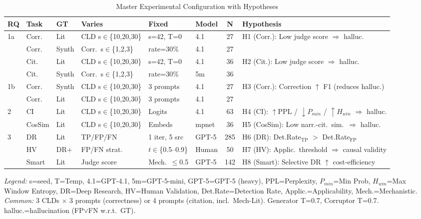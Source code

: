 \begin{table}[H]
\centering
\caption{Master Experimental Configuration with Hypotheses}
\label{tab:master}
\scriptsize
\renewcommand{\arraystretch}{1.2}
\begin{tabularx}{\textwidth}{@{}l l l l l l c X@{}}
\toprule
\textbf{RQ} & \textbf{Task} & \textbf{GT} & \textbf{Varies} & \textbf{Fixed} & \textbf{Model} & \textbf{N} & \textbf{Hypothesis} \\
\midrule
\multirow{4}{*}{1a} 
  & Corr. & Lit & CLD s$\in$\{10,20,30\} & s=42, T=0 & 4.1 & 27 & \multirow{2}{*}{H1 (Corr.): Low judge score $\Rightarrow$ halluc.} \\
  & Corr. & Synth & Corr.\ s$\in$\{1,2,3\} & rate=30\% & 4.1 & 27 & \\
  & Cit. & Lit & CLD s$\in$\{10,20,30\} & s=42, T=0 & 4.1 & 36 & \multirow{2}{*}{H2 (Cit.): Low judge score $\Rightarrow$ halluc.} \\
  & Cit. & Synth & Corr.\ s$\in$\{1,2,3\} & rate=30\% & 5m & 36 & \\
\midrule
\multirow{2}{*}{1b}
  & Corr. & Synth & CLD s$\in$\{10,20,30\} & 3 prompts & 4.1 & 27 & \multirow{2}{*}{H3 (Corr.): Correction $\uparrow$ F1 (reduces halluc.)} \\
  & Corr. & Lit & CLD s$\in$\{10,20,30\} & 3 prompts & 4.1 & 27 & \\
\midrule
\multirow{2}{*}{2}
  & CI & Lit & CLD s$\in$\{10,20,30\} & Logits & 4.1 & 63 & H4 (CI): $\uparrow$PPL / $\downarrow P_{min}$ / $\uparrow H_{win}$ $\Rightarrow$ halluc. \\
  & CosSim & Lit & CLD s$\in$\{10,20,30\} & Embeds & mpnet & 36 & H5 (CosSim): Low narr.-cit.\ sim.\ $\Rightarrow$ halluc. \\
\midrule
\multirow{3}{*}{3}
  & DR & Lit & TP/FP/FN & 1 iter, 5 src & GPT-5 & 285 & H6 (DR): Det.Rate$_{\text{TP}}$ $>$ Det.Rate$_{\text{FP}}$ \\
  & HV & DR+ & FP/FN strat. & $t\in$\{0.5--0.9\} & Human & 50 & H7 (HV): Applic.\ threshold $\Rightarrow$ causal validity \\
  & Smart & Lit & Judge score & Mech.\ $\leq$0.5 & GPT-5 & 142 & H8 (Smart): Selective DR $\uparrow$ cost-efficiency \\
\bottomrule
\end{tabularx}
\vspace{0.3em}

\scriptsize
\textit{Legend:} s=seed, T=Temp, 4.1=GPT-4.1, 5m=GPT-5-mini, GPT-5=GPT-5 (heavy), PPL=Perplexity, $P_{min}$=Min Prob, $H_{win}$=Max Window Entropy, DR=Deep Research, HV=Human Validation, Det.Rate=Detection Rate, Applic.=Applicability, Mech.=Mechanistic. \\
\textit{Common:} 3 CLDs $\times$ 3 prompts (correctness) or 4 prompts (citation, incl.\ Mech-Lit). Generator T=0.7, Corruptor T=0.7. halluc.=hallucination (FP$\lor$FN w.r.t.\ GT).
\end{table}

